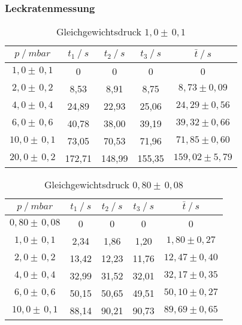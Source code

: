 \subsubsection{Leckratenmessung}

\begin{table}[H]
\centering
\label{tab:leck_Dreh1}
\begin{tabular}{c|c|c|c|c}
	{$p \:/\: \si{mbar}$} & {$t_1 \:/\: \si{s} $} & {$t_2 \:/\: \si{s} $} & {$t_3 \:/\: \si{s} $} & {$\bar{t} \:/\: \si{s}$}\\
\midrule
$1,0 \pm \, 0,1$ &0 &0 &0 &0\\
$2,0 \pm \, 0,2$ &   8,53 &  8,91 &  8,75 & $8,73 \pm 0,09$\\
$4,0 \pm \, 0,4$ &   24,89  &  22,93 &  25,06 & $24,29 \pm 0,56 $\\
$6,0 \pm \, 0,6$ &   40,78 &  38,00 &  39,19 & $39,32 \pm 0,66 $\\
$10,0 \pm \, 0,1$ &   73,05 &  70,53 &  71,96 & $71,85 \pm 0,60 $\\
$20,0 \pm \, 0,2$ &   172,71 &  148,99 &  155,35 & $159,02 \pm 5,79 $\\
\end{tabular}
\caption{Gleichgewichtsdruck $1,0 \pm \, 0,1$}
\end{table}

\begin{table}[H]
\centering
\label{tab:leck_Dreh2}
\begin{tabular}{c|c|c|c|c}
	{$p \:/\: \si{mbar}$} & {$t_1 \:/\: \si{s} $} & {$t_2 \:/\: \si{s} $} & {$t_3 \:/\: \si{s} $} & {$\bar{t} \:/\: \si{s}$}\\
\midrule
$0,80 \pm \, 0,08$ &0 &0 &0 &0\\
$1,0 \pm \, 0,1$ &   2,34 &  1,86 &  1,20 & $1,80 \pm 0,27$\\
$2,0 \pm \, 0,2$ &   13,42  &  12,23 &  11,76 & $12,47 \pm 0,40 $\\
$4,0 \pm \, 0,4$ &   32,99 &  31,52 &  32,01 & $32,17 \pm 0,35 $\\
$6,0 \pm \, 0,6$  &   50,15 &  50,65 &  49,51 & $50,10 \pm 0,27 $\\
$10,0 \pm \, 0,1$ &   88,14 &  90,21 &  90,73 & $89,69 \pm 0,65 $\\
\end{tabular}
\caption{Gleichgewichtsdruck $0,80 \pm \, 0,08$}
\end{table}

